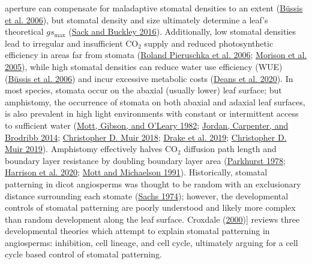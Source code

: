 \documentclass[12pt,halfline,a4paper,]{ouparticle}
\begin{document}
aperture can compensate for maladaptive stomatal densities to an extent
(\protect\hyperlink{ref-bussis_stomatal_2006}{Büssis et al. 2006}), but
stomatal density and size ultimately determine a leaf's theoretical
\(gs_\text{max}\) (\protect\hyperlink{ref-sack_developmental_2016}{Sack
and Buckley 2016}). Additionally, low stomatal densities lead to
irregular and insufficient CO\(_2\) supply and reduced photosynthetic
efficiency in areas far from stomata
(\protect\hyperlink{ref-pieruschka_lateral_2006}{Roland Pieruschka et
al. 2006}; \protect\hyperlink{ref-morison_lateral_2005}{Morison et al.
2005}), while high stomatal densities can reduce water use efficiency
(WUE) (\protect\hyperlink{ref-bussis_stomatal_2006}{Büssis et al. 2006})
and incur excessive metabolic costs
(\protect\hyperlink{ref-deans_optimization_2020}{Deans et al. 2020}). In
most species, stomata occur on the abaxial (usually lower) leaf surface;
but amphistomy, the occurrence of stomata on both abaxial and adaxial
leaf surfaces, is also prevalent in high light environments with
constant or intermittent access to sufficient water
(\protect\hyperlink{ref-mott_adaptive_1982}{Mott, Gibson, and O'Leary
1982}; \protect\hyperlink{ref-jordan_using_2014}{Jordan, Carpenter, and
Brodribb 2014}; \protect\hyperlink{ref-muir_light_2018}{Christopher D.
Muir 2018}; \protect\hyperlink{ref-drake_two_2019}{Drake et al. 2019};
\protect\hyperlink{ref-muir_is_2019}{Christopher D. Muir 2019}).
Amphistomy effectively halves CO\(_2\) diffusion path length and
boundary layer resistance by doubling boundary layer area
(\protect\hyperlink{ref-parkhurst_adaptive_1978}{Parkhurst 1978};
\protect\hyperlink{ref-harrison_influence_2020}{Harrison et al. 2020};
\protect\hyperlink{ref-mott_amphistomy_1991}{Mott and Michaelson 1991}).
Historically, stomatal patterning in dicot angiosperms was thought to be
random with an exclusionary distance surrounding each stomate
(\protect\hyperlink{ref-sachs_developmental_1974}{Sachs 1974}); however,
the developmental controls of stomatal patterning are poorly understood
and likely more complex than random development along the leaf surface.
Croxdale (\protect\hyperlink{ref-croxdale_stomatal_2000}{2000}){]}
reviews three developmental theories which attempt to explain stomatal
patterning in angiosperms: inhibition, cell lineage, and cell cycle,
ultimately arguing for a cell cycle based control of stomatal
patterning.
\end{document}
